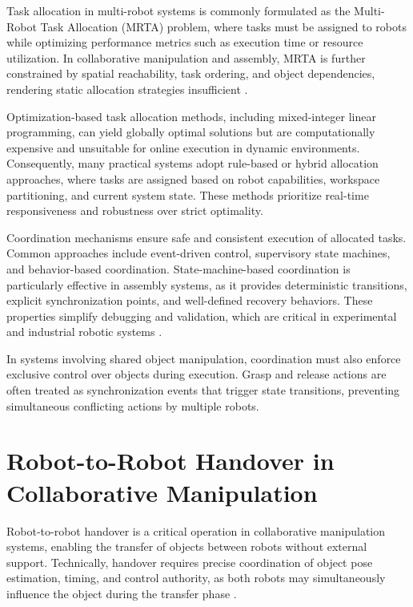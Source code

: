 Task allocation in multi-robot systems is commonly formulated as the Multi-Robot Task Allocation (MRTA) problem, where tasks must be assigned to robots while optimizing performance metrics such as execution time or resource utilization. In collaborative manipulation and assembly, MRTA is further constrained by spatial reachability, task ordering, and object dependencies, rendering static allocation strategies insufficient \cite{gerkey2004formal}.

Optimization-based task allocation methods, including mixed-integer linear programming, can yield globally optimal solutions but are computationally expensive and unsuitable for online execution in dynamic environments. Consequently, many practical systems adopt rule-based or hybrid allocation approaches, where tasks are assigned based on robot capabilities, workspace partitioning, and current system state. These methods prioritize real-time responsiveness and robustness over strict optimality.

Coordination mechanisms ensure safe and consistent execution of allocated tasks. Common approaches include event-driven control, supervisory state machines, and behavior-based coordination. State-machine-based coordination is particularly effective in assembly systems, as it provides deterministic transitions, explicit synchronization points, and well-defined recovery behaviors. These properties simplify debugging and validation, which are critical in experimental and industrial robotic systems \cite{kruger2010learning}.

In systems involving shared object manipulation, coordination must also enforce exclusive control over objects during execution. Grasp and release actions are often treated as synchronization events that trigger state transitions, preventing simultaneous conflicting actions by multiple robots.

\section{Robot-to-Robot Handover in Collaborative Manipulation}

Robot-to-robot handover is a critical operation in collaborative manipulation systems, enabling the transfer of objects between robots without external support. Technically, handover requires precise coordination of object pose estimation, timing, and control authority, as both robots may simultaneously influence the object during the transfer phase \cite{desantis2008atlas}.

